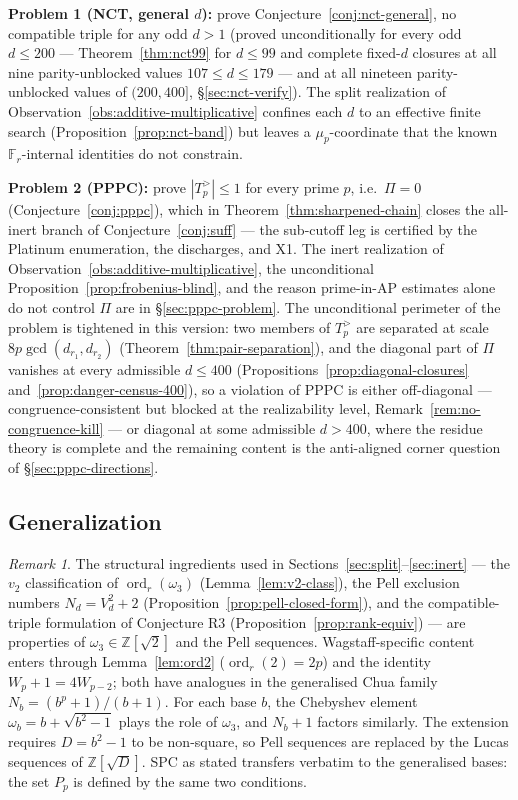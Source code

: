\documentclass[11pt]{amsart}
\theoremstyle{plain}
\theoremstyle{definition}
\theoremstyle{remark}
\newtheorem*{remarknonum}{Remark}
\numberwithin{equation}{section}
\newcommand{\ord}{\operatorname{ord}}
\newcommand{\Z}{\mathbb{Z}}
\newcommand{\F}{\mathbb{F}}
\begin{document}
\textbf{Problem 1 (NCT, general $d$):} prove Conjecture~\ref{conj:nct-general}, no compatible triple for any odd $d > 1$ (proved unconditionally for every odd $d \leq 200$ --- Theorem~\ref{thm:nct99} for $d \leq 99$ and complete fixed-$d$ closures at all nine parity-unblocked values $107 \leq d \leq 179$ --- and at all nineteen parity-unblocked values of $(200,400]$, \S\ref{sec:nct-verify}). The split realization of Observation~\ref{obs:additive-multiplicative} confines each $d$ to an effective finite search (Proposition~\ref{prop:nct-band}) but leaves a $\mu_p$-coordinate that the known $\F_r$-internal identities do not constrain.

\textbf{Problem 2 (PPPC):} prove $|T_p^{>}| \leq 1$ for every prime $p$, i.e.\ $\Pi = 0$ (Conjecture~\ref{conj:pppc}), which in Theorem~\ref{thm:sharpened-chain} closes the all-inert branch of Conjecture~\ref{conj:suff} --- the sub-cutoff leg is certified by the Platinum enumeration, the discharges, and X1. The inert realization of Observation~\ref{obs:additive-multiplicative}, the unconditional Proposition~\ref{prop:frobenius-blind}, and the reason prime-in-AP estimates alone do not control $\Pi$ are in \S\ref{sec:pppc-problem}. The unconditional perimeter of the problem is tightened in this version: two members of $T_p^{>}$ are separated at scale $8 p \gcd(d_{r_1}, d_{r_2})$ (Theorem~\ref{thm:pair-separation}), and the diagonal part of $\Pi$ vanishes at every admissible $d \leq 400$ (Propositions~\ref{prop:diagonal-closures} and~\ref{prop:danger-census-400}), so a violation of PPPC is either off-diagonal --- congruence-consistent but blocked at the realizability level, Remark~\ref{rem:no-congruence-kill} --- or diagonal at some admissible $d > 400$, where the residue theory is complete and the remaining content is the anti-aligned corner question of \S\ref{sec:pppc-directions}.

\subsection{Generalization}\label{sec:generalization}

\begin{remarknonum}
The structural ingredients used in Sections~\ref{sec:split}--\ref{sec:inert} --- the $v_2$ classification of $\ord_r(\omega_3)$ (Lemma~\ref{lem:v2-class}), the Pell exclusion numbers $N_d = V_d^2 + 2$ (Proposition~\ref{prop:pell-closed-form}), and the compatible-triple formulation of Conjecture R3 (Proposition~\ref{prop:rank-equiv}) --- are properties of $\omega_3 \in \Z[\sqrt 2]$ and the Pell sequences. Wagstaff-specific content enters through Lemma~\ref{lem:ord2} ($\ord_r(2) = 2 p$) and the identity $W_p + 1 = 4 W_{p-2}$; both have analogues in the generalised Chua family $N_b = (b^p + 1)/(b + 1)$. For each base $b$, the Chebyshev element $\omega_b = b + \sqrt{b^2 - 1}$ plays the role of $\omega_3$, and $N_b + 1$ factors similarly. The extension requires $D = b^2 - 1$ to be non-square, so Pell sequences are replaced by the Lucas sequences of $\Z[\sqrt D]$. SPC as stated transfers verbatim to the generalised bases: the set $P_p$ is defined by the same two conditions.
\end{remarknonum}
\end{document}
